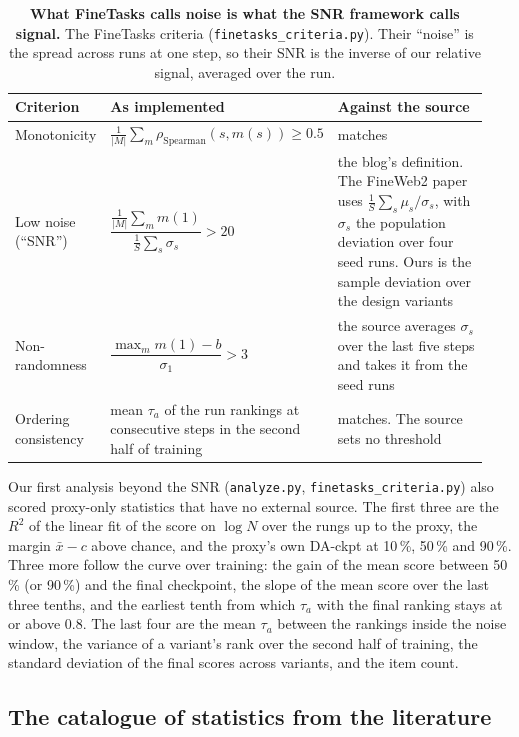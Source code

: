 \begin{table}[t]
\centering
\scriptsize
\begin{tabular}{@{}p{0.14\linewidth}p{0.33\linewidth}p{0.47\linewidth}@{}}
\toprule
\textbf{Criterion} & \textbf{As implemented} & \textbf{Against the source} \\
\midrule
Monotonicity & $\frac{1}{|M|}\sum_{m}\rho_{\text{Spearman}}(s, m(s)) \geq 0.5$ & matches \\
Low noise (``SNR'') & $\dfrac{\frac{1}{|M|}\sum_m m(1)}{\frac{1}{S}\sum_s \sigma_s} > 20$ & the blog's definition. The FineWeb2 paper uses $\frac{1}{S}\sum_s \mu_s/\sigma_s$, with $\sigma_s$ the population deviation over four seed runs. Ours is the sample deviation over the design variants \\
Non-randomness & $\dfrac{\max_m m(1) - b}{\sigma_{1}} > 3$ & the source averages $\sigma_s$ over the last five steps and takes it from the seed runs \\
Ordering consistency & mean $\tau_a$ of the run rankings at consecutive steps in the second half of training & matches. The source sets no threshold \\
\bottomrule
\end{tabular}
\caption{\textbf{What FineTasks calls noise is what the SNR framework calls signal.} The FineTasks criteria (\texttt{finetasks\_criteria.py}). Their ``noise'' is the spread across runs at one step, so their SNR is the inverse of our relative signal, averaged over the run.}
\label{tab:sur-finetasks}
\end{table}

Our first analysis beyond the SNR (\texttt{analyze.py}, \texttt{finetasks\_criteria.py}) also scored proxy-only statistics that have no external source. The first three are the $R^2$ of the linear fit of the score on $\log N$ over the rungs up to the proxy, the margin $\bar{x} - c$ above chance, and the proxy's own DA-ckpt at 10\,\%, 50\,\% and 90\,\%. Three more follow the curve over training: the gain of the mean score between 50\,\% (or 90\,\%) and the final checkpoint, the slope of the mean score over the last three tenths, and the earliest tenth from which $\tau_a$ with the final ranking stays at or above 0.8. The last four are the mean $\tau_a$ between the rankings inside the noise window, the variance of a variant's rank over the second half of training, the standard deviation of the final scores across variants, and the item count.

\subsection{The catalogue of statistics from the literature}
\label{app:sur-catalogue}

